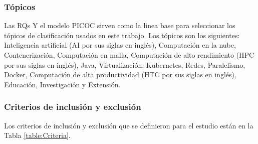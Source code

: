 \subsubsection{Tópicos}
Las RQs Y el modelo PICOC sirven como la linea base para seleccionar los tópicos de clasificación usados en este trabajo. Los tópicos son los siguientes: Inteligencia artificial (AI por sus siglas en inglés), Computación en la nube, Contenerización, Computación en malla, Computación de alto rendimiento (HPC por sus siglas en inglés), Java, Virtualización, Kubernetes, Redes, Paralelismo, Docker, Computación de alta productividad (HTC por sus siglas en inglés), Educación, Investigación y Extensión.

\subsubsection{Criterios de inclusión y exclusión}
Los criterios de inclusión y exclusión que se definieron para el estudio están en la Tabla \ref{table:Criteria}.

